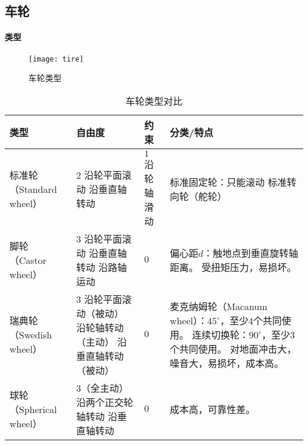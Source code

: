 \documentclass[
12pt, %
a4paper, 
oneside, %
headinclude,footinclude, %
]{scrartcl}
\begin{document}
\subsection[车轮]{车轮}
\paragraph{类型}
\begin{figure}[H]
\centering 
\texttt{[image: tire]} 
\caption{车轮类型}
\end{figure}

\begin{table}[H]
\centering
\begin{tabular}{|p{2cm}|p{4.2cm}|p{2.2cm}|p{7cm}|}
\hline
类型 & 自由度 & 约束 & 分类/特点 \\
\hline
标准轮 \newline （Standard wheel） & $ 2 $ \newline 沿轮平面滚动 \newline 沿垂直轴转动 & $ 1 $ \newline 沿轮轴滑动 & 标准固定轮：只能滚动 \newline 标准转向轮（舵轮） \\
\hline
脚轮 \newline （Castor wheel） & $ 3 $ \newline 沿轮平面滚动 \newline 沿垂直轴转动 \newline 沿路轴运动 & $ 0 $ & 偏心距$ d $：触地点到垂直旋转轴距离。 \newline 受扭矩压力，易损坏。 \\
\hline
瑞典轮 \newline （Swedish wheel） & $ 3 $ \newline 沿轮平面滚动（被动） \newline 沿轮轴转动（主动） \newline 沿垂直轴转动（被动） & $ 0 $ & 麦克纳姆轮（Macanum wheel）：$ 45^\circ $，至少$ 4 $个共同使用。 \newline 连续切换轮：$ 90^\circ $，至少$ 3 $个共同使用。 \newline 对地面冲击大，噪音大，易损坏，成本高。 \\
\hline
球轮 \newline （Spherical wheel） & $ 3 $（全主动） \newline 沿两个正交轮轴转动 \newline 沿垂直轴转动 & $ 0 $ & 成本高，可靠性差。 \\
\hline
\end{tabular}
\caption{车轮类型对比}
\end{table}
\end{document}
